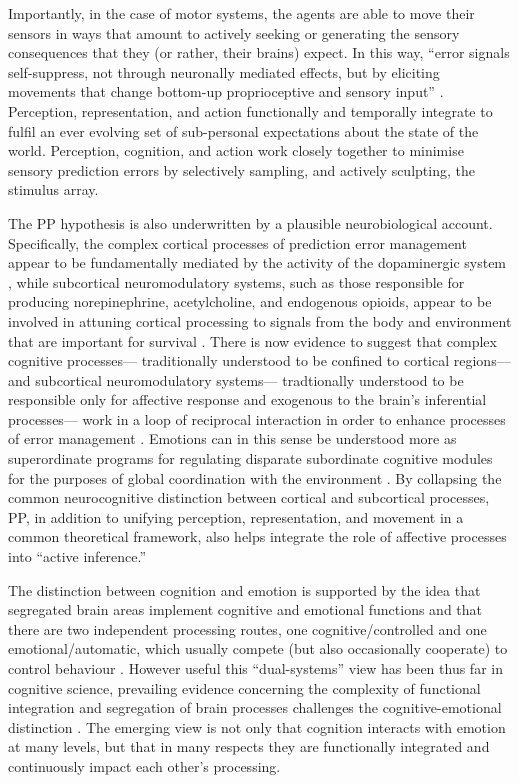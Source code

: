 \begin{CJK}{UTF8}{gbsn}
{
Importantly, in the case of motor systems, the agents are able to move their sensors in ways that amount to actively seeking or generating the sensory consequences that they (or rather, their brains) expect.  In this way, ``error signals self-suppress, not through neuronally mediated effects, but by eliciting movements that change bottom-up proprioceptive and sensory input'' \citep[186]{Clark2013}. Perception, representation, and action functionally and temporally integrate to fulfil an ever evolving set of sub-personal expectations about the state of the world.  Perception, cognition, and action work closely together to minimise sensory prediction errors by selectively sampling, and actively sculpting, the stimulus array.

The PP hypothesis is also underwritten by a plausible neurobiological account. Specifically, the complex cortical processes of prediction error management appear to be fundamentally mediated by the activity of the dopaminergic system \citep{Schultz2016}, while subcortical neuromodulatory systems, such as those responsible for producing norepinephrine, acetylcholine, and endogenous opioids, appear to be involved in attuning cortical processing to signals from the body and environment that are important for survival \citep{Lewis2005}.  There is now evidence to suggest that complex cognitive processes--- traditionally understood to be confined to cortical regions--- and subcortical neuromodulatory systems--- tradtionally understood to be responsible only for affective response and exogenous to the brain's inferential processes--- work in a loop of reciprocal interaction in order to enhance processes of error management \citep{Damasio1994,Lewis2005,Miller2017,Barrett2017}.
Emotions can in this sense be understood more as superordinate programs for regulating disparate subordinate cognitive modules for the purposes of global coordination with the environment \citep{Cosmides2000}.  By collapsing the common neurocognitive distinction between cortical and subcortical processes, PP, in addition to unifying perception, representation, and movement in a common theoretical framework, also helps integrate the role of affective processes into ``active inference.''

The distinction between cognition and emotion is supported by the idea that segregated brain areas implement cognitive and emotional functions and that there are two independent processing routes, one cognitive/controlled and one emotional/automatic, which usually compete (but also occasionally cooperate) to control behaviour \citep{Kahneman2003}.  However useful this ``dual-systems'' view has been thus far in cognitive science, prevailing evidence concerning the complexity of functional integration and segregation of brain processes challenges the cognitive-emotional distinction \citep{Pessoa2013}.  The emerging view is not only that cognition interacts with emotion at many levels, but that in many respects they are functionally integrated and continuously impact each other's processing.

}
\end{CJK}
